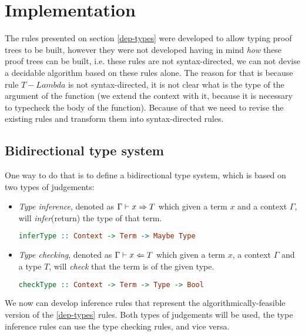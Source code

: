 \chapter{Implementation}

The rules presented on section \ref{dep-types} were developed to allow typing proof trees to be built, however they were not developed having in mind \emph{how} these proof trees can be built, i.e. these rules are not syntax-directed, we can not devise a decidable algorithm based on these rules alone.
The reason for that is because rule $T-Lambda$ is not syntax-directed, it is not clear what is the type of the argument of the function (we extend the context with it, because it is necessary to typecheck the body of the function).
Because of that we need to revise the existing rules and transform them into syntax-directed rules.

\section{Bidirectional type system}

One way to do that is to define a bidirectional type system, which is based on two types of judgements:
\begin{itemize}
       \item \emph{Type inference}, denoted as $\Gamma \vdash x \Rightarrow T$ which given a term $x$ and a context $\Gamma$, will \emph{infer}(return) the type of that term.
             \begin{lstlisting}[language=Haskell,numbers=none]
                    inferType :: Context -> Term -> Maybe Type
             \end{lstlisting}
       \item \emph{Type checking}, denoted as $\Gamma \vdash x \Leftarrow T$ which given a term $x$, a context $\Gamma$ and a type $T$, will \emph{check} that the term is of the given type.
             \begin{lstlisting}[language=Haskell,numbers=none]
                    checkType :: Context -> Term -> Type -> Bool
             \end{lstlisting}
\end{itemize}

We now can develop inference rules that represent the algorithmically-feasible version of the \ref{dep-types} rules. Both types of judgements will be used, the type inference rules can use the type checking rules, and vice versa.

